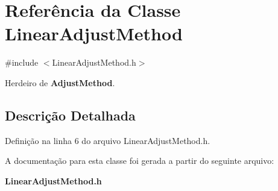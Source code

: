 \section{Referência da Classe Linear\+Adjust\+Method}
\label{class_linear_adjust_method}


{\ttfamily \#include $<$Linear\+Adjust\+Method.\+h$>$}



Herdeiro de {\bf Adjust\+Method}.



\subsection{Descrição Detalhada}


Definição na linha 6 do arquivo Linear\+Adjust\+Method.\+h.



A documentação para esta classe foi gerada a partir do seguinte arquivo\+:\begin{DoxyCompactItemize}
\item 
{\bf Linear\+Adjust\+Method.\+h}\end{DoxyCompactItemize}
